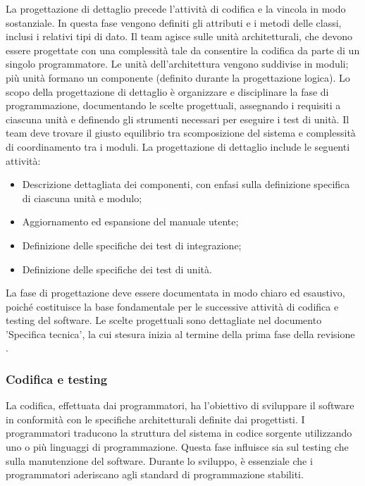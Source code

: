 \label{progettazione-dettaglio}
\par La progettazione di dettaglio precede l’attività di codifica e la vincola in modo sostanziale. In questa fase vengono definiti gli attributi e i metodi delle classi, inclusi i relativi tipi di dato. Il team agisce sulle unità architetturali, che devono essere progettate con una complessità tale da consentire la codifica da parte di un singolo programmatore. Le unità dell’architettura vengono suddivise in moduli; più unità formano un componente (definito durante la progettazione logica). Lo scopo della progettazione di dettaglio è organizzare e disciplinare la fase di programmazione, documentando le scelte progettuali, assegnando i requisiti a ciascuna unità e definendo gli strumenti necessari per eseguire i test di unità. Il team deve trovare il giusto equilibrio tra scomposizione del sistema e complessità di coordinamento tra i moduli. La progettazione di dettaglio include le seguenti attività:
\begin{itemize}
  \item Descrizione dettagliata dei componenti, con enfasi sulla definizione specifica di ciascuna unità e modulo;
  \item Aggiornamento ed espansione del manuale utente;
  \item Definizione delle specifiche dei test di integrazione;
  \item Definizione delle specifiche dei test di unità.
\end{itemize}

\label{specifica-tecnica}
\par La fase di progettazione deve essere documentata in modo chiaro ed esaustivo, poiché costituisce la base fondamentale per le successive attività di codifica e testing del software. Le scelte progettuali sono dettagliate nel documento 'Specifica tecnica', la cui stesura inizia al termine della prima fase della revisione .

\subsubsection{Codifica e testing}\label{codificatesting}

\par La codifica, effettuata dai programmatori, ha l'obiettivo di sviluppare il software in conformità con le specifiche architetturali definite dai progettisti. I programmatori traducono la struttura del sistema in codice sorgente utilizzando uno o più linguaggi di programmazione. Questa fase influisce sia sul testing che sulla manutenzione del software. Durante lo sviluppo, è essenziale che i programmatori aderiscano agli standard di programmazione stabiliti.

